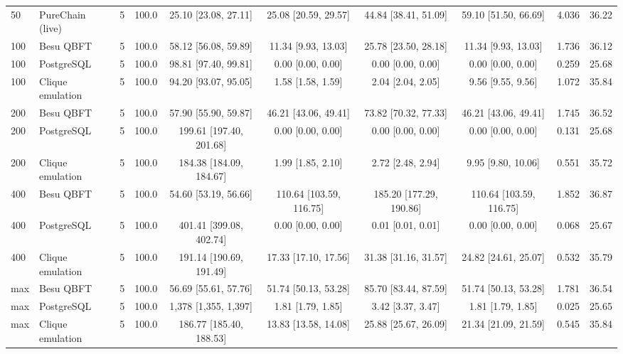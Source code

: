 \begin{table}[t]
\begin{adjustbox}{max width=\textwidth}
\begin{tabular}{llrrcccccr}
50 & PureChain (live) & 5 & 100.0 & 25.10 [23.08, 27.11] & 25.08 [20.59, 29.57] & 44.84 [38.41, 51.09] & 59.10 [51.50, 66.69] & 4.036 & 36.22 \\
100 & Besu QBFT & 5 & 100.0 & 58.12 [56.08, 59.89] & 11.34 [9.93, 13.03] & 25.78 [23.50, 28.18] & 11.34 [9.93, 13.03] & 1.736 & 36.12 \\
100 & PostgreSQL & 5 & 100.0 & 98.81 [97.40, 99.81] & 0.00 [0.00, 0.00] & 0.00 [0.00, 0.00] & 0.00 [0.00, 0.00] & 0.259 & 25.68 \\
100 & Clique emulation & 5 & 100.0 & 94.20 [93.07, 95.05] & 1.58 [1.58, 1.59] & 2.04 [2.04, 2.05] & 9.56 [9.55, 9.56] & 1.072 & 35.84 \\
200 & Besu QBFT & 5 & 100.0 & 57.90 [55.90, 59.87] & 46.21 [43.06, 49.41] & 73.82 [70.32, 77.33] & 46.21 [43.06, 49.41] & 1.745 & 36.52 \\
200 & PostgreSQL & 5 & 100.0 & 199.61 [197.40, 201.68] & 0.00 [0.00, 0.00] & 0.00 [0.00, 0.00] & 0.00 [0.00, 0.00] & 0.131 & 25.68 \\
200 & Clique emulation & 5 & 100.0 & 184.38 [184.09, 184.67] & 1.99 [1.85, 2.10] & 2.72 [2.48, 2.94] & 9.95 [9.80, 10.06] & 0.551 & 35.72 \\
400 & Besu QBFT & 5 & 100.0 & 54.60 [53.19, 56.66] & 110.64 [103.59, 116.75] & 185.20 [177.29, 190.86] & 110.64 [103.59, 116.75] & 1.852 & 36.87 \\
400 & PostgreSQL & 5 & 100.0 & 401.41 [399.08, 402.74] & 0.00 [0.00, 0.00] & 0.01 [0.01, 0.01] & 0.00 [0.00, 0.00] & 0.068 & 25.67 \\
400 & Clique emulation & 5 & 100.0 & 191.14 [190.69, 191.49] & 17.33 [17.10, 17.56] & 31.38 [31.16, 31.57] & 24.82 [24.61, 25.07] & 0.532 & 35.79 \\
max & Besu QBFT & 5 & 100.0 & 56.69 [55.61, 57.76] & 51.74 [50.13, 53.28] & 85.70 [83.44, 87.59] & 51.74 [50.13, 53.28] & 1.781 & 36.54 \\
max & PostgreSQL & 5 & 100.0 & 1,378 [1,355, 1,397] & 1.81 [1.79, 1.85] & 3.42 [3.37, 3.47] & 1.81 [1.79, 1.85] & 0.025 & 25.65 \\
max & Clique emulation & 5 & 100.0 & 186.77 [185.40, 188.53] & 13.83 [13.58, 14.08] & 25.88 [25.67, 26.09] & 21.34 [21.09, 21.59] & 0.545 & 35.84 \\
\bottomrule
\end{tabular}\end{adjustbox}
\end{table}
